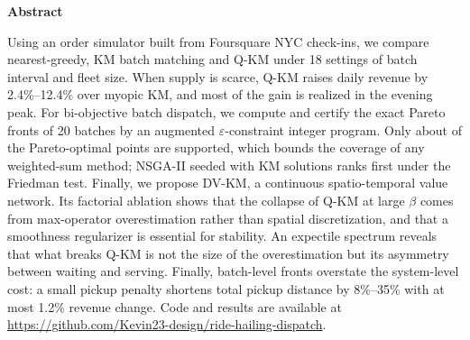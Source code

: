 \documentclass[twocolumn]{article}
\begin{document}
\begin{minipage}{\textwidth}
	\centering
	{\noindent \textbf{\large Abstract}}
	\vspace{0.5em}
\end{minipage}
\begin{minipage}{1\textwidth}
	\setlength{\parindent}{2em}
	\indent Using an order simulator built from Foursquare NYC check-ins, we compare nearest-greedy, KM batch matching and Q-KM under 18 settings of batch interval and fleet size. When supply is scarce, Q-KM raises daily revenue by 2.4\%--12.4\% over myopic KM, and most of the gain is realized in the evening peak. For bi-objective batch dispatch, we compute and certify the exact Pareto fronts of 20 batches by an augmented $\varepsilon$-constraint integer program. Only about \supfrac{} of the Pareto-optimal points are supported, which bounds the coverage of any weighted-sum method; NSGA-II seeded with KM solutions ranks first under the Friedman test. Finally, we propose DV-KM, a continuous spatio-temporal value network. Its factorial ablation shows that the collapse of Q-KM at large $\beta$ comes from max-operator overestimation rather than spatial discretization, and that a smoothness regularizer is essential for stability. An expectile spectrum reveals that what breaks Q-KM is not the size of the overestimation but its asymmetry between waiting and serving. \HINDSIGHTABSEN{} Finally, batch-level fronts overstate the system-level cost: a small pickup penalty shortens total pickup distance by 8\%--35\% with at most 1.2\% revenue change. Code and results are available at \url{https://github.com/Kevin23-design/ride-hailing-dispatch}.
\end{minipage}
\vspace{0.6em}
\end{document}
